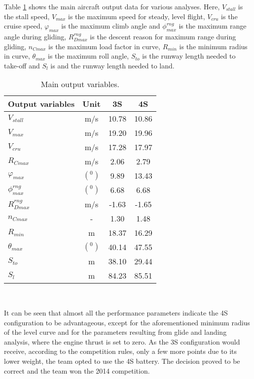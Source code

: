 \documentclass[10pt]{SelfArx} %
\begin{document}
Table \ref{Tab:output_variables} shows the main aircraft output data for various analyses. Here, $V_{stall}$ is the stall speed, $V_{max}$ is   the maximum speed for steady, level flight, $V_{cru}$ is the cruise speed, $\varphi_{max}$ is the maximum climb angle and $\phi_{max}^{rng}$ is the  maximum range angle during gliding, $R_{Dmax}^{rng}$ is the descent reason for maximum range during gliding, $n_{Cmax}$ is the maximum load factor in curve, $R_ {min}$ is the minimum radius in curve,  $\theta_ {max}$ is the maximum roll angle, $S_{to}$  is the runway length needed to take-off and  $S_l$ is  and the runway length needed to land. 
\begin{table}[htb]
\small\sf\centering
\caption{Main output variables.\label{Tab:output_variables}}
\begin{tabular}{lccc}
\toprule
Output variables			&Unit			&3S 			&4S 		\\
\midrule
{$V_{stall}$} 			&m/s			&10.78		&10.86	\\
{$V_{max}$} 			&m/s			&19.20		&19.96	\\
{$V_{cru}$} 				&m/s			&17.28		&17.97	\\
{$R_{Cmax}$} 			&m/s  			&2.06			&2.79		\\
{$\varphi_{max}$} 			&$({}^0)$ 		&9.89			&13.43	\\
{$\phi_{max}^{rng}$} 		&$({}^0)$ 		&6.68			&6.68		\\
{$R_{Dmax}^{rng}$}		&m/s     		&-1.63		&-1.65	\\
{$n_{Cmax}$}			&-			&1.30			&1.48		\\
{$R_{min}$}				&m			&18.37		&16.29	\\
{$\theta_{max}$}			&$({}^0)$ 		&40.14		&47.55	\\
{$S_{to}$}				&m			&38.10		&29.44	\\
{$S_{l}$}				&m			&84.23		&85.51	\\
\bottomrule
\end{tabular}\\[16pt]
\end{table}

It can be seen that almost all the performance parameters indicate the 4S configuration to be advantageous, except for the aforementioned minimum radius of the level curve and for the parameters resulting from glide and landing analysis, where the engine thrust is set to zero. As the 3S configuration would receive, according to the competition rules, only a few more points due to its lower weight, the team opted to use the 4S battery. The decision proved to be correct and the team won the 2014 competition. 
\end{document}
